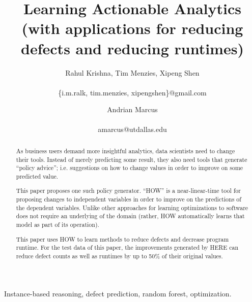 \documentclass[conference]{IEEEtran}
\title{Learning Actionable Analytics 
 (with applications for reducing defects and reducing runtimes)}
\author{
%
%
Rahul Krishna, Tim Menzies, Xipeng Shen\\
       \affaddr{Computer Science, NcState, USA}\\
       \{i.m.ralk, tim.menzies, xipengshen\}@gmail.com
\and
 Andrian Marcus\\
       \affaddr{Computer Science, UtDallas, USA}\\
       {amarcus@utdallas.edu} }
\begin{document}
  \maketitle
  
  
   
  \begin{abstract}
 As business users demand more insightful
 analytics, data scientists need to change
 their tools. Instead of merely predicting 
 some result, they also need tools that generate ``policy advice'';
 i.e. suggestions on  how to change values in order to
 improve on some predicted value.
 
 This paper proposes one such policy
 generator. ``HOW'' is a near-linear-time
 tool for proposing changes to independent
 variables in order to improve on 
 the predictions of the dependent variables. Unlike other approaches
 for learning optimizations to software does not require
 an underlying of the domain (rather, HOW automatically
 learns that model as part of its operation). 
 
 This paper uses  HOW to learn methods
 to reduce defects and decrease program runtime.
 For the test data of this paper, the improvements generated by HERE can reduce
 defect counts as well as runtimes by up to
 50\% of their original values.
  \end{abstract}
  \begin{IEEEkeywords}
Instance-based reasoning, defect prediction, random forest, optimization.
  \end{IEEEkeywords}
  
\end{document}

